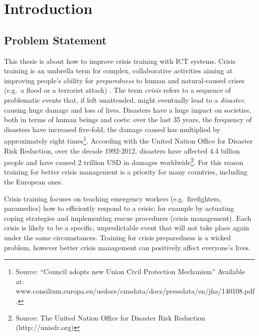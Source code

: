 \mainmatter

\chapter{Introduction}\label{introduction}

\section{Problem Statement}\label{problem-statement}

This thesis is about how to improve crisis training with ICT systems. Crisis training is an umbrella term for complex, collaborative activities aiming at improving people's ability for \emph{preparedness} to human and natural-caused crises (e.g.~a flood or a terrorist attack) \autocite{Lagadec:1997js}. The term \emph{crisis} refers to a sequence of problematic events that, if left unattended, might eventually lead to a \emph{disaster}, causing huge damage and loss of lives. Disasters have a huge impact on societies, both in terms of human beings and costs: over the last 35 years, the frequency of disasters have increased five-fold; the damage caused has multiplied by approximately eight times\footnote{Source: ``Council adopts new Union Civil Protection Mechanism'' Available at: www.consilium.europa.eu/uedocs/cmsdata/docs/pressdata/en/jha/140108.pdf.}. According with the United Nation Office for Disaster Risk Reduction, over the decade 1992-2012, disasters have affected 4.4 billion people and have caused 2 trillion USD in damages worldwide\footnote{Source: The United Nation Office for Disaster Risk Reduction (http://unisdr.org)}. For this reason training for better crisis management is a priority for many countries, including the European ones.

Crisis training focuses on teaching emergency workers (e.g.~firefighters, paramedics) how to efficiently respond to a crisis; for example by actuating coping strategies and implementing rescue procedures (crisis management). Each crisis is likely to be a specific, unpredictable event that will not take place again under the same circumstances. Training for crisis preparedness is a wicked problem, however better crisis management can positively affect everyone's lives.

